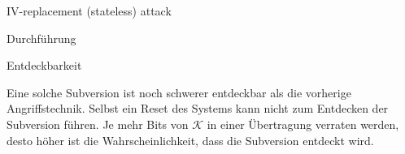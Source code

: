 \begin{section}{IV-replacement (stateless) attack}
\begin{subsection}{Durchführung}
\end{subsection}

\begin{subsection}{Entdeckbarkeit}

Eine solche Subversion ist noch schwerer entdeckbar als die vorherige Angriffstechnik. Selbst ein Reset des Systems kann nicht zum Entdecken der Subversion führen. Je mehr Bits von $\mathcal{K}$ in einer Übertragung verraten werden, desto höher ist die Wahrscheinlichkeit, dass die Subversion entdeckt wird.

\end{subsection}

\end{section}